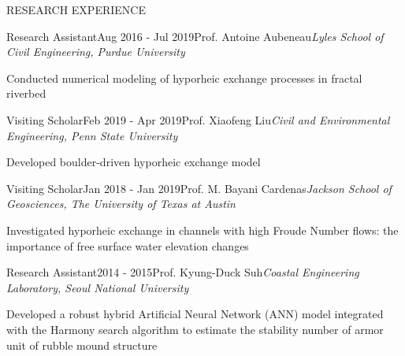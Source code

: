 \documentclass{resume_anzy.cls} %
\begin{document}
\begin{rSection}{RESEARCH EXPERIENCE }



\begin{rSubsection}{Research Assistant}{Aug 2016 - Jul 2019}{Prof. Antoine Aubeneau}{\textit{Lyles School of Civil Engineering, Purdue University}}
\item Conducted numerical modeling of hyporheic exchange processes in fractal riverbed
\end{rSubsection}


\vspace{-2.5mm}
\begin{rSubsection}{Visiting Scholar}{Feb 2019 - Apr 2019}{Prof. Xiaofeng Liu}{\textit{Civil and Environmental Engineering, Penn State University}}
\item Developed boulder-driven hyporheic exchange model
\end{rSubsection}

\vspace{-2.5mm}
\begin{rSubsection}{Visiting Scholar}{Jan 2018 - Jan 2019}{Prof. M. Bayani Cardenas}{\textit{Jackson School of Geosciences, The University of Texas at Austin}}
\item  Investigated hyporheic exchange in channels with high Froude Number flows: the importance of free surface water elevation changes
\end{rSubsection}

\vspace{-2.5mm}
\begin{rSubsection}{Research Assistant}{2014 - 2015}{Prof. Kyung-Duck Suh}{\textit{Coastal Engineering Laboratory, Seoul National University}}
\item Developed a robust hybrid Artificial Neural Network (ANN) model integrated with the Harmony search algorithm to estimate the stability number of armor unit of rubble mound structure 
\end{rSubsection}



\end{rSection}

\end{document}
